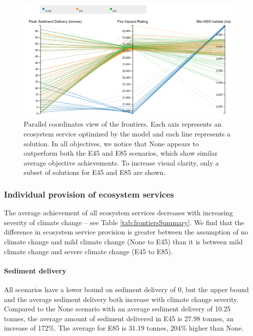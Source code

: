\begin{figure}[ht]
\centering
\includegraphics[width=.85\textwidth]{../images/FrontiersPCPlot}
\caption[Parallel coordinates view of the three frontiers]{Parallel coordinates view of the frontiers. Each axis represents an ecosystem service optimized by the model and each line represents a solution. In all objectives, we notice that None appears to outperform both the E45 and E85 scenarios, which show similar average objective achievements. To increase visual clarity, only a subset of solutions for E45 and E85 are shown.}
\label{fig:frontiersPCPlot}
\end{figure}


\subsubsection{Individual provision of ecosystem services}
The average achievement of all ecosystem services decreases with increasing severity of climate change -- see Table \ref{tab:frontiersSummary}. We find that the difference in ecosystem service provision is greater between the assumption of no climate change and mild climate change (None to E45) than it is between mild climate change and severe climate change (E45 to E85).

\paragraph{Sediment delivery} 
All scenarios have a lower bound on sediment delivery of 0, but the upper bound and the average sediment delivery both increase with climate change severity. Compared to the None scenario with an average sediment delivery of 10.25 tonnes, the average amount of sediment delivered in E45 is 27.98 tonnes, an increase of 172\%. The average for E85 is 31.19 tonnes, 204\% higher than None.

